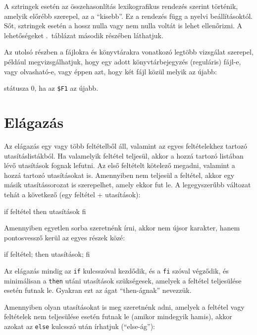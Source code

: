 A sztringek esetén az összehasonlítás lexikografikus rendezés szerint történik,
amelyik előrébb szerepel, az a ``kisebb''. Ez a rendezés függ a nyelvi
beállításoktól. Sőt, sztringek esetén a hossz nulla vagy nem nulla voltát is
lehet ellenőrizni. A lehetőségeket .\ táblázat
második részében láthatjuk.

Az utolsó részben a fájlokra és könyvtárakra vonatkozó legtöbb vizsgálat
szerepel, például megvizsgálhatjuk, hogy egy adott könyvtárbejegyzés (reguláris)
fájl-e, vagy olvasható-e, vagy éppen azt, hogy két fájl közül melyik az újabb:

\begin{VerbExample}
[ $F1 -nt $F2]
\end{VerbExample}

\noindent státusza 0, ha az \texttt{\$F1} az újabb.


\section{Elágazás}

Az elágazás egy vagy több feltételből áll, valamint az egyes feltételekhez
tartozó utasításlistákból. Ha valamelyik feltétel teljesül, akkor a hozzá
tartozó listában lévő utasítások fognak lefutni. Az első feltételt kötelező
megadni, valamint a hozzá tartozó utasításokat is. Amennyiben nem teljesül a
feltétel, akkor egy másik utasítássorozat is szerepelhet, amely ekkor fut le.
A legegyszerűbb változat tehát a következő (egy feltétel + utasítások):

\begin{VerbExample}
if feltétel
then
    utasítások
fi   
\end{VerbExample}

\noindent Amennyiben egyetlen sorba szeretnénk írni, akkor nem újsor karakter,
hanem pontosvessző kerül az egyes részek közé:

\begin{VerbExample}
if feltétel; then utasítások; fi
\end{VerbExample}

\noindent Az elágazás mindig az \texttt{if} kulcsszóval kezdődik, és a
\texttt{fi} szóval végződik, és minimálisan a \texttt{then} utáni utasítások
szükségesek, amelyek a feltétel teljesülése esetén futnak le. Gyakran ezt az
ágat ``then-ágnak'' nevezzük.

Amennyiben olyan utasításokat is meg szeretnénk adni, amelyek a feltétel vagy
feltételek nem teljesülése esetén futnak le (amikor mindegyik hamis), akkor
azokat az \texttt{else} kulcsszó után írhatjuk (``else-ág''):

